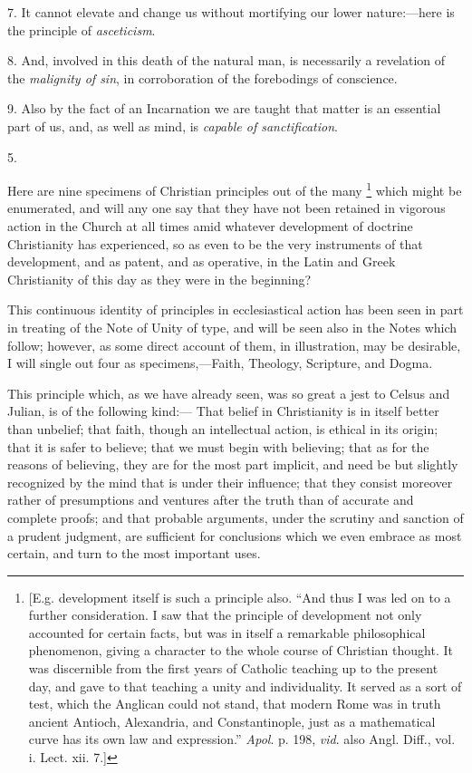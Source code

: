 7. It cannot elevate and change us without mortifying our lower
nature:—here is the principle of \emph{asceticism}.

8. And, involved in this death of the natural man, is necessarily a
revelation of the \emph{malignity of sin}, in corroboration of the
forebodings of conscience.

9. Also by the fact of an Incarnation we are taught that matter is
an essential part of us, and, as well as mind, is \emph{capable of
sanctification}.

5.

Here are nine specimens of Christian principles out of the many \footnote{[E.g. development itself is such a principle also. ``And
thus I was led on to a further consideration. I saw that the principle
of development not only accounted for certain facts, but was in itself
a remarkable philosophical phenomenon, giving a character to the whole
course of Christian thought. It was discernible from the first years
of Catholic teaching up to the present day, and gave to that teaching
a unity and individuality. It served as a sort of test, which the
Anglican could not stand, that modern Rome was in truth ancient
Antioch, Alexandria, and Constantinople, just as a mathematical curve
has its own law and expression.'' \emph{Apol}. p. 198, \emph{vid}.
also Angl. Diff., vol. i. Lect. xii. 7.]} which might be enumerated, and will any one say that they have
not been retained in vigorous action in the Church at all times amid
whatever development of doctrine Christianity has experienced, so as
even to be the very instruments of that development, and as patent,
and as operative, in the Latin and Greek Christianity of this day as
they were in the beginning?

This continuous identity of principles in ecclesiastical action has
been seen in part in treating of the Note of Unity of type, and will
be seen also in the Notes which follow; however, as some direct
account of them, in illustration, may be desirable, I will single out
four as specimens,—Faith, Theology, Scripture, and Dogma.


This principle which, as we have already seen, was so great a jest
to Celsus and Julian, is of the following kind:— That belief in
Christianity is in itself better than unbelief; that faith, though an
intellectual action, is ethical in its origin; that it is safer to
believe; that we must begin with believing; that as for the reasons of
believing, they are for the most part implicit, and need be but
slightly recognized by the mind that is under their influence; that
they consist moreover rather of presumptions and ventures after the
truth than of accurate and complete proofs; and that probable
arguments, under the scrutiny and sanction of a prudent judgment, are
sufficient for conclusions which we even embrace as most certain, and
turn to the most important uses.

